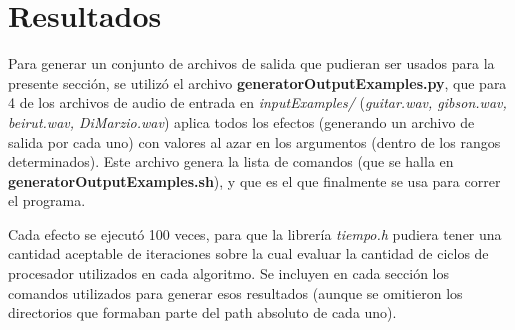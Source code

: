 \section{Resultados}
\label{sec:resultados}

Para generar un conjunto de archivos de salida que pudieran ser usados para la presente sección, se utilizó el archivo \textbf{generatorOutputExamples.py}, que para 4 de los archivos de audio de entrada en \textit{inputExamples/} (\textit{guitar.wav, gibson.wav, beirut.wav, DiMarzio.wav}) aplica todos los efectos (generando un archivo de salida por cada uno) con valores al azar en los argumentos (dentro de los rangos determinados). Este archivo genera la lista de comandos (que se halla en \textbf{generatorOutputExamples.sh}), y que es el que finalmente se usa para correr el programa.
 
Cada efecto se ejecutó 100 veces, para que la librería \textit{tiempo.h} pudiera tener una cantidad aceptable de iteraciones sobre la cual evaluar la cantidad de ciclos de procesador utilizados en cada algoritmo. Se incluyen en cada sección los comandos utilizados para generar esos resultados (aunque se omitieron los directorios que formaban parte del path absoluto de cada uno).







